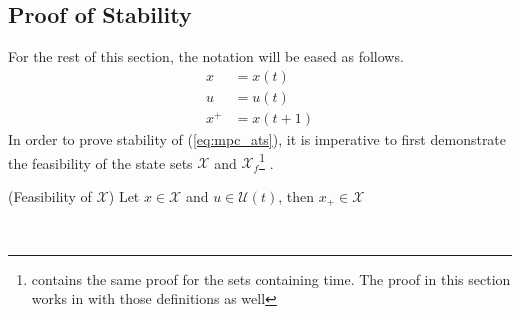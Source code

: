 \subsection{Proof of Stability}

For the rest of this section, the notation will be eased as follows. 
\begin{align*}
	x &= x(t)\\
	u &= u(t)\\
	x^+ &= x(t+1)
\end{align*} In order to prove stability of (\ref{eq:mpc_ats}), it is imperative to first demonstrate the feasibility of the state sets $\mathcal{X}$ and $\mathcal{X}_f$\footnote{ contains the same proof for the sets containing time. The proof in this section works in with those definitions as well} .\\


\begin{proposition}{(Feasibility of $\mathcal{X}$)}\label{pro:feas_x}
	Let $x \in \mathcal{X}$ and $u \in \mathcal{U}(t)$, then $x_+ \in \mathcal{X}$
\end{proposition}\\

